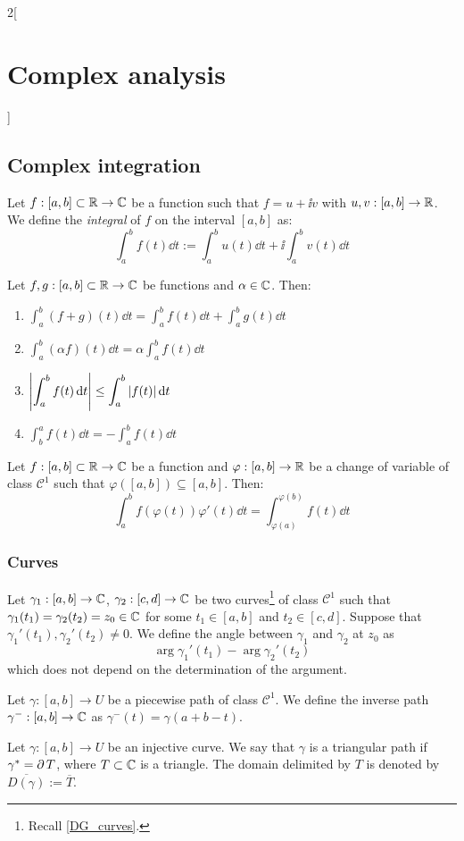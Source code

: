 \documentclass[../../../main.tex]{subfiles}
\begin{document}
\begin{multicols}{2}[\section{Complex analysis}]
  \subsection{Complex integration}
  \begin{definition}
    Let $f:[a,b]\subset\mathbb{R}\rightarrow\mathbb{C}$ be a function such that $f=u+\ii v$ with $u,v:[a,b]\rightarrow\mathbb{R}$. We define the \emph{integral} of $f$ on the interval $[a,b]$ as: $$\int_a^bf(t)\dd{t}:=\int_a^bu(t)\dd{t}+\ii\int_a^bv(t)\dd{t}$$
  \end{definition}
  \begin{proposition}
    Let $f,g:[a,b]\subset\mathbb{R}\rightarrow\mathbb{C}$ be functions and $\alpha\in\mathbb{C}$. Then:
    \begin{enumerate}
      \item $\displaystyle\int_a^b(f+g)(t)\dd{t}=\int_a^bf(t)\dd{t}+\int_a^bg(t)\dd{t}$
      \item $\displaystyle\int_a^b(\alpha f)(t)\dd{t}=\alpha \int_a^bf(t)\dd{t}$
      \item $\displaystyle\abs{\int_a^bf(t)\dd{t}}\leq\int_a^b|f(t)|\dd{t}$
      \item $\displaystyle \int_b^af(t)\dd{t}=-\int_a^bf(t)\dd{t}$
    \end{enumerate}
  \end{proposition}
  \begin{proposition}
    Let $f:[a,b]\subset\mathbb{R}\rightarrow\mathbb{C}$ be a function and $\varphi:[a,b]\rightarrow\mathbb{R}$ be a change of variable of class $\mathcal{C}^1$ such that $\varphi([a,b])\subseteq[a,b]$. Then: $$\int_a^bf(\varphi(t))\varphi'(t)\dd{t}=\int_{\varphi(a)}^{\varphi(b)}f(t)\dd{t}$$
  \end{proposition}
  \subsubsection{Curves}
  \begin{definition}
    Let $\gamma_1:[a,b]\rightarrow\mathbb{C}$, $\gamma_2:[c,d]\rightarrow\mathbb{C}$ be two curves\footnote{Recall \cref{DG_curves}.} of class $\mathcal{C}^1$ such that $\gamma_1(t_1)=\gamma_2(t_2)=z_0\in\mathbb{C}$ for some $t_1\in[a,b]$ and $t_2\in[c,d]$. Suppose that ${\gamma_1}'(t_1),{\gamma_2}'(t_2)\ne 0$. We define the angle between $\gamma_1$ and $\gamma_2$ at $z_0$ as $$\arg{\gamma_1}'(t_1)-\arg{\gamma_2}'(t_2)$$ which does not depend on the determination of the argument.
  \end{definition}
  \begin{definition}
    Let $\gamma:[a,b]\rightarrow U$ be a piecewise path of class $\mathcal{C}^1$. We define the inverse path $\gamma^-:[a,b]\rightarrow\mathbb{C}$ as $\gamma^-(t)=\gamma(a+b-t)$.
  \end{definition}
  \begin{definition}
    Let $\gamma:[a,b]\rightarrow U$ be an injective curve. We say that $\gamma$ is a triangular path if $\gamma^*=\operatorname{\partial} T$, where $T\subset\mathbb{C}$ is a triangle. The domain delimited by $T$ is denoted by $\overline{D(\gamma)}:=\overline{T}$.
  \end{definition}

\end{multicols}
\end{document}
